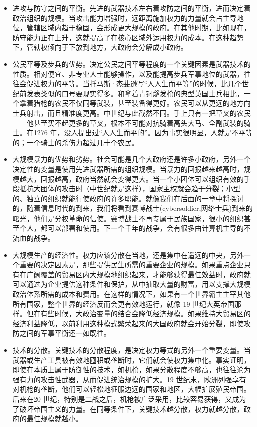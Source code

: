 \begin{itemize}
    \item 进攻与防守之间的平衡。先进的武器技术左右着攻防之间的平衡，进而决定着政治组织的规模。当攻击能力增强时，远距离施加权力的力量就会占主导地位，管辖区域内趋于稳固，会形成更大规模的政府。在其他时期，比如现在，防守能力正在上升，这就提高了在核心区域外运用权力的成本。在这种趋势下，管辖权倾向于下放到地方，大政府会分解成小政府。
    \item 公民平等及步兵的优势。决定公民之间平等程度的一个关键因素是武器技术的性质。相对便宜、非专业人士能够操作，以及能提高步兵军事地位的武器，往往会促进权力的平等。当托马斯·杰斐逊写“人人生而平等”的时候，比几个世纪前发表类似的口号要现实得多。和拿着青铜燧发枪的典型英国士兵相比，一个拿着猎枪的农民不仅同等武装，甚至装备得更好。农民可以从更远的地方向士兵射击，而且精准度更高。中世纪与此截然不同。手上只有一把草叉的农民——他甚至买不起更多的草叉，根本不可能对抗骑着高头大马、全副武装的骑士。在1276 年，没人提出过“人人生而平的”。因为事实很明显，人就是不平等的；一个骑士的杀伤力超过几十个农民。
    \item 大规模暴力的优势和劣势。社会可能是几个大政府还是许多小政府，另外一个决定性的变量是使用先进武器所需的组织规模。当暴力的回报越来越高时，规模越大，回报越高，政府当然就会变得更大。当一个小团体可以组织有效的手段抵抗大团体的攻击时（中世纪就是这样），国家主权就会趋于分裂；小型的、独立的组织就能行使政府的许多职能。就像我们在后面的一章中将探讨的，随着信息时代的到来，我们将看到赛博战士(cybersoldier,网络士兵)到来的曙光，他们是分权革命的信使。赛博战士不再专属于民族国家，很小的组织甚至个人，都可以部署和使用。下一个千年的战争，会有很多由计算机主导的不流血的战争。
    \item 大规模生产的经济性。权力应该分散在当地，还是集中在遥远的中央，另外一个重要的决定因素是，那些提供民生所需的重要企业的规模。如果重点企业只有在广阔覆盖的贸易区内大规模地组织起来，才能够获得最佳效益时，政府就可以通过为企业提供这种条件和保护，从中抽取大量的财富，用以支撑大规模政治体系所需的成本和费用。在这样的情况下，如果有一个世界霸主主宰其他所有国家，整个世界的经济反而会更有效地运行，就像 19 世纪大英帝国那样。但在有些时候，大政治变量的结合会降低经济规模。如果维持大贸易区的经济利益降低，以前利用这种模式繁荣起来的大国政府就会开始分裂，即使攻防之间的军事平衡还一如既往。
    \item 技术的分散。关键技术的分散程度，是决定权力等式的另外一个重要变量。当武器或生产工具被有效地囤积或垄断时，它们就会使权力集中化。事实证明，即使在本质上属于防御性的技术，如机枪，如果分散程度不够高，也往往沦为强有力的攻击性武器，从而促进统治规模的扩大。19 世纪末，欧洲列强享有对机枪的垄断，他们可以轻松地征服边远的国家和地区，大幅扩展殖民帝国。后来在20 世纪，特别是二战之后，机枪被广泛采用，比较容易获得，又成为了破坏帝国主义的力量。在同等条件下，关键技术越分散，权力就越分散，政府的最佳规模就越小。
\end{itemize}

